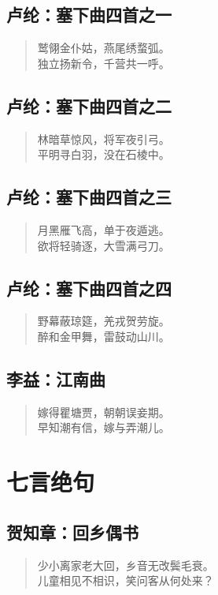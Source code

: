 \documentclass[12pt,oneside]{book}
\newenvironment{shici}{
\begin{verse}
\centering\large\hspace{12pt}}
{\end{verse}}
\begin{document}
\chapter{卢纶：塞下曲四首之一}
\begin{shici}
鹫翎金仆姑，燕尾绣蝥弧。\\
独立扬新令，千营共一呼。
\end{shici}

\chapter{卢纶：塞下曲四首之二}
\begin{shici}
林暗草惊风，将军夜引弓。\\
平明寻白羽，没在石棱中。
\end{shici}

\chapter{卢纶：塞下曲四首之三}
\begin{shici}
月黑雁飞高，单于夜遁逃。\\
欲将轻骑逐，大雪满弓刀。
\end{shici}

\chapter{卢纶：塞下曲四首之四}
\begin{shici}
野幕蔽琼筵，羌戎贺劳旋。\\
醉和金甲舞，雷鼓动山川。
\end{shici}

\chapter{李益：江南曲}
\begin{shici}
嫁得瞿塘贾，朝朝误妾期。\\
早知潮有信，嫁与弄潮儿。
\end{shici}


\part{七言绝句}
\chapter{贺知章：回乡偶书}
\begin{shici}
少小离家老大回，乡音无改鬓毛衰。\\
儿童相见不相识，笑问客从何处来？
\end{shici}
\end{document}
